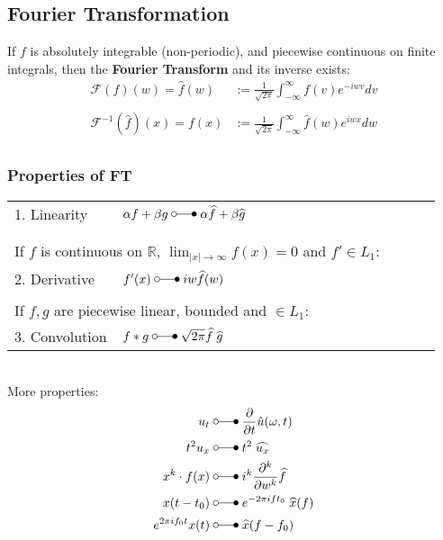 \subsection{Fourier Transformation}
If $f$ is absolutely integrable (non-periodic), and piecewise continuous on finite integrals,
then the \textbf{Fourier Transform} and its inverse exists:
\begin{align*}
    \mathcal{F}(f)(w)=\widehat{f}(w)      & :=\frac1{\sqrt{2\pi}}\int_{-\infty}^{\infty}f(v)e^{-iwv}dv          \\\\
    \mathcal{F}^{-1}(\widehat{f})(x)=f(x) & :=\frac1{\sqrt{2\pi}}\int_{-\infty}^{\infty}\widehat{f}(w)e^{iwx}dw \\
\end{align*}
\subsubsection{Properties of FT}

\begin{tabular}[h]{p{0.25\linewidth} p{0.74\linewidth}}
    1. Linearity   & $\alpha f+\beta g\;\laplace\;\alpha\widehat{f}+\beta\widehat{g}$                                     \\
                   &                                                                                                      \\
                   &                                                                                                      \\
    \multicolumn{2}{p{0.9\linewidth}}{If $f$ is continuous on $\mathbb{R}$, $\lim_{|x|\to\infty}f(x)=0$ and $f'\in L_1$:} \\
    2. Derivative  & $f^{\prime}(x)\;\laplace\;iw\widehat{f}(w)$                                                          \\
                   &                                                                                                      \\
    \multicolumn{2}{p{0.9\linewidth}}{If $f,g$ are piecewise linear, bounded and $\in L_1$:}                              \\
    3. Convolution & $f*g\;\laplace\;\sqrt{2\pi}\widehat{f}\;\widehat{g}$                                                 \\
\end{tabular}\vspace*{8pt}\\
More properties:
\begin{align*}
    u_t                & \;\laplace\;\frac\partial{\partial t}\hat{u}(\omega,t)     \\
    t^2u_x             & \;\laplace\; t^2\;\widehat{u_x}                            \\
    x^k\cdot f(x)      & \;\laplace\;i^k \frac{\partial^k}{\partial w^k}\widehat{f} \\
    x(t-t_0)           & \;\laplace\; e^{-2\pi ift_0}\;\widehat{x}(f)               \\
    e^{2\pi if_0t}x(t) & \;\laplace\; \widehat{x}(f-f_0)
\end{align*}

